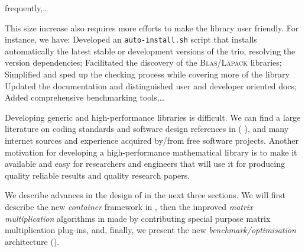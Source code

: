 frequently,\dots
%
\par
%
This size increase also requires more efforts to make the library user friendly. For
instance, we have:
%
Developed an \texttt{auto-install.sh} script that installs automatically the
latest stable or development versions of the trio, resolving the version
dependencies;
%
Facilitated the discovery of the \textsc{Blas}/\textsc{Lapack} libraries;
%
Simplified and sped up the checking process while covering more of the library
%
Updated the documentation and distinguished user and developer oriented docs;
%
Added comprehensive benchmarking tools,\dots
%
%
\par
%
Developing generic and high-performance libraries is difficult. We can find a
large literature on coding standards and software design references in (\cf{}
\cite{alexandrescu:01:modern,gamma:95:design,sutter:05:cpp,stroustrup1994design,Douglas:05:GPHP}),
and many internet sources and experience acquired by/from free
software projects.
Another motivation for developing a high-performance
mathematical library is to make it available and easy for researchers and
engineers that will use it for producing quality reliable results and quality
research papers.
%
\par
%
We describe advances in the design of \linbox in the next
three sections. We will first describe the new \emph{container} framework in
, then the improved \emph{matrix multiplication} algorithms
in  made by contributing special purpose matrix multiplication
plug-ins, and, finally, we present the new \emph{benchmark/optimisation}
architecture ().
%
\par
